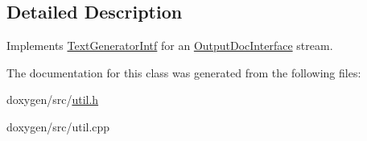 \subsection{Detailed Description}
Implements \mbox{\hyperlink{class_text_generator_intf}{Text\+Generator\+Intf}} for an \mbox{\hyperlink{class_output_doc_interface}{Output\+Doc\+Interface}} stream. 

The documentation for this class was generated from the following files\+:\begin{DoxyCompactItemize}
\item 
doxygen/src/\mbox{\hyperlink{util_8h}{util.\+h}}\item 
doxygen/src/util.\+cpp\end{DoxyCompactItemize}
